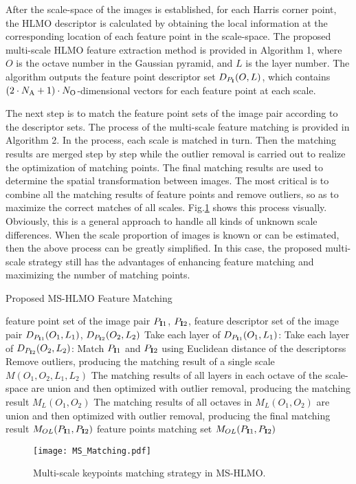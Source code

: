 After the scale-space of the images is established, for each Harris corner point, the HLMO descriptor is calculated by obtaining the local information at the corresponding location of each feature point in the scale-space. The proposed multi-scale HLMO feature extraction method is provided in Algorithm 1, where $O$ is the octave number in the Gaussian pyramid, and $L$ is the layer number. The algorithm outputs the feature point descriptor set $D_{P_{\bf{I}}}(O,L)$, which contains $(2 \cdot {N_{\rm{A}}}+1) \cdot {N_{\rm{O}}}$-dimensional vectors for each feature point at each scale.

The next step is to match the feature point sets of the image pair according to the descriptor sets. The process of the multi-scale feature matching is provided in Algorithm 2. In the process, each scale is matched in turn. Then the matching results are merged step by step while the outlier removal is carried out to realize the optimization of matching points. The final matching results are used to determine the spatial transformation between images. The most critical is to combine all the matching results of feature points and remove outliers, so as to maximize the correct matches of all scales. Fig.\ref{fig:pyramids} shows this process visually. Obviously, this is a general approach to handle all kinds of unknown scale differences. When the scale proportion of images is known or can be estimated, then the above process can be greatly simplified. In this case, the proposed multi-scale strategy still has the advantages of enhancing feature matching and maximizing the number of matching points.

\begin{algorithm}[htp]
\caption{\label{multi2} \footnotesize Proposed MS-HLMO Feature Matching}
\begin{algorithmic}
\footnotesize
{} feature point set of the image pair $P_{{\bf{I}}1}$, $P_{{\bf{I}}2}$, feature descriptor set of the image pair $D_{P_{{\bf{I}}1}}(O_{1},L_{1})$, $D_{P_{{\bf{I}}2}}(O_{2},L_{2})$
\STATE Take each layer of $D_{P_{{\bf{I}}1}}(O_{1},L_{1})$:
\STATE \hspace*{0.1in}Take each layer of $D_{P_{{\bf{I}}2}}(O_{2},L_{2})$:
\STATE \hspace*{0.2in}Match $P_{{\bf{I}}1}$ and $P_{{\bf{I}}2}$ using Euclidean distance of the descriptorss
\STATE \hspace*{0.2in}Remove outliers, producing the matching result of a single scale $M(O_{1},O_{2},L_{1},L_{2})$
\STATE The matching results of all layers in each octave of the scale-space are union and then optimized with outlier removal, producing the matching result $M_{L}(O_{1},O_{2})$
\STATE The matching results of all octaves in $M_{L}(O_{1},O_{2})$ are union and then optimized with outlier removal, producing the final matching result $M_{OL}(P_{{\bf{I}}1},P_{{\bf{I}}2})$
 feature points matching set $M_{OL}(P_{{\bf{I}}1},P_{{\bf{I}}2})$
\end{algorithmic}
\end{algorithm}

\begin{figure}[h!]
 \begin{center}
  \texttt{[image: MS\_Matching.pdf]}
  \caption{Multi-scale keypoints matching strategy in MS-HLMO.}
  \label{fig:pyramids}
 \end{center}
\end{figure}